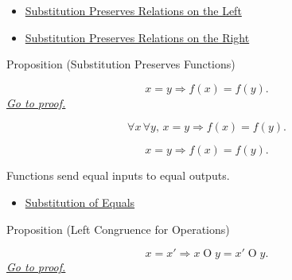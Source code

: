 \begin{dependencies}
\begin{itemize}
  \item \hyperref[prop:substitution-preserves-relations-left]{Substitution Preserves Relations on the Left}
  \item \hyperref[prop:substitution-preserves-relations-right]{Substitution Preserves Relations on the Right}
\end{itemize}
\end{dependencies}

\begin{propositionbox}{Proposition (Substitution Preserves Functions)}
\begin{proposition}
\label{prop:substitution-preserves-functions}
\[
x=y \Longrightarrow f(x)=f(y).
\]
\hyperref[prf:substitution-preserves-functions]{\textit{Go to proof.}}
\end{proposition}
\end{propositionbox}

\begin{remark*}
\[
\forall x\,\forall y,\,
x=y \Longrightarrow f(x)=f(y).
\]
\end{remark*}

\begin{remark*}
\[
x=y \Longrightarrow f(x)=f(y).
\]
\end{remark*}

\begin{remark*}[Interpretation]
Functions send equal inputs to equal outputs.
\end{remark*}

\begin{dependencies}
\begin{itemize}
  \item \hyperref[ax:equality-substitution]{Substitution of Equals}
\end{itemize}
\end{dependencies}

\begin{propositionbox}{Proposition (Left Congruence for Operations)}
\begin{proposition}
\label{prop:substitution-preserves-operations-left}
\[
x=x' \Longrightarrow x\mathbin{O}y=x'\mathbin{O}y.
\]
\hyperref[prf:substitution-preserves-operations-left]{\textit{Go to proof.}}
\end{proposition}
\end{propositionbox}

